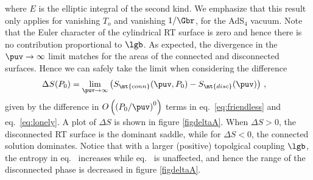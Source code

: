 where $E$ is the elliptic integral of the second kind. We emphasize that this result only applies for  vanishing $T_o$ and vanishing $1/\Gbr$, \ie  for the AdS$_4$ vacuum. Note that the Euler character of the cylindrical RT surface is zero and hence there is no contribution proportional to $\lgb$. As expected, the divergence in the $\puv\to\infty$ limit matches for the areas of the connected and disconnected surfaces. Hence we can safely take the limit when considering the difference
\begin{align}\label{dAP01}
\Delta S(P_0)&=\lim_{\puv\to \infty}\left( S_\mt{conn}(\puv,P_0)-S_\mt{disc} (\puv)\right)\,,
\end{align}
given by the difference in $O\left( \left( P_0/\puv \right)^0 \right)$ terms in eq.~\eqref{eq:friendless} and eq.~\eqref{eq:lonely}.
A plot of $\Delta S$ is shown in figure \ref{figdeltaA}. When $\Delta S>0$, the disconnected RT surface is the dominant saddle, while for $\Delta S<0$, the connected solution dominates. Notice that with a larger (positive) topolgical coupling $\lgb$, the entropy in eq.~ increases while eq.~ is unaffected, and hence the range of the disconnected phase is decreased in figure \ref{figdeltaA}.

%

\begin{figure}[th]
	\def\svgwidth{0.8\linewidth}
\end{figure}

